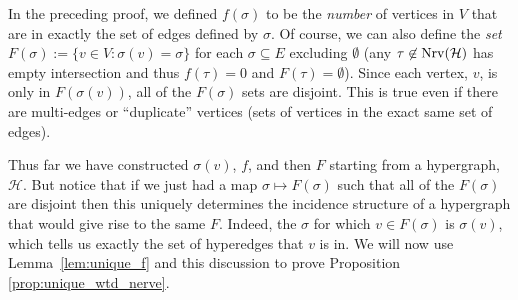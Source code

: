\documentclass{amsart}
\newtheorem{lemma}[theorem]{Lemma}
\renewcommand{\H}{\mathcal{H}}
\newcommand{\Nrv}{\mm{\mathrm{Nrv}}}
\newcommand {\mm}[1]        {\ifmmode{#1}\else{\mbox{\(#1\)}}\fi}
\begin{document}
In the preceding proof, we defined $f(\sigma)$ to be the \emph{number} of vertices in $V$ that are in exactly the set of edges defined by $\sigma$. Of course, we can also define the \emph{set} $F(\sigma) := \{v \in V : \sigma(v) = \sigma\}$ for each $\sigma \subseteq E$ excluding $\emptyset$ (any $\tau \not\in \Nrv(\H)$ has empty intersection and thus $f(\tau)=0$ and $F(\tau)=\emptyset$). 
Since each vertex, $v$, is only in $F(\sigma(v))$, all of the $F(\sigma)$ sets are disjoint.
This is true even if there are multi-edges or ``duplicate'' vertices (sets of vertices in the exact same set of edges). 

Thus far we have constructed $\sigma(v)$, $f$, and then $F$ starting from a hypergraph, $\H$. 
But notice that if we just had a map $\sigma \mapsto F(\sigma)$ such that all of the $F(\sigma)$ are disjoint then this uniquely determines the incidence structure of a hypergraph that would give rise to the same $F$. Indeed, the $\sigma$ for which $v \in F(\sigma)$ is $\sigma(v)$, which tells us exactly the set of hyperedges that $v$ is in.
We will now use Lemma~\ref{lem:unique_f} and this discussion to prove Proposition \ref{prop:unique_wtd_nerve}.


\end{document}
